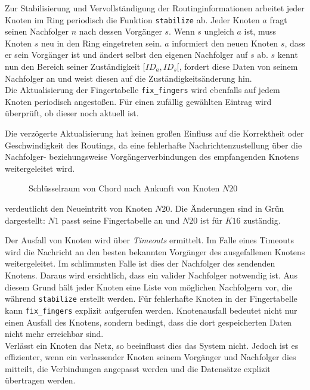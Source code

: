Zur Stabilisierung und Vervollständigung der Routinginformationen arbeitet jeder Knoten im Ring periodisch die Funktion \texttt{stabilize} ab. Jeder Knoten $a$ fragt seinen Nachfolger $n$ nach dessen Vorgänger $s$. Wenn $s$ ungleich $a$ ist, muss Knoten $s$ neu in den Ring eingetreten sein. $a$ informiert den neuen Knoten $s$, dass er sein Vorgänger ist und ändert selbst den eigenen Nachfolger auf $s$ ab. $s$ kennt nun den Bereich seiner Zuständigkeit $[ID_a, ID_s[$, fordert diese Daten von seinem Nachfolger an und weist diesen auf die Zuständigkeitsänderung hin.\\
Die Aktualisierung der Fingertabelle \texttt{fix\_fingers} wird ebenfalls auf jedem Knoten periodisch angestoßen. Für einen zufällig gewählten Eintrag wird überprüft, ob dieser noch aktuell ist.

Die verzögerte Aktualisierung hat keinen großen Einfluss auf die Korrektheit oder Geschwindigkeit des Routings, da eine fehlerhafte Nachrichtenzustellung über die Nachfolger- beziehungsweise Vorgängerverbindungen des empfangenden Knotens weitergeleitet wird.

\begin{figure}[htbp]
\centering
{}
\caption{Schlüsselraum von Chord nach Ankunft von Knoten $N20$}
\label{fig:chord_new_node}
\end{figure}

 verdeutlicht den Neueintritt von Knoten $N20$. Die Änderungen sind in Grün dargestellt: $N1$ passt seine Fingertabelle an und $N20$ ist für $K16$ zuständig.

Der Ausfall von Knoten wird über \emph{Timeouts} ermittelt. Im Falle eines Timeouts wird die Nachricht an den besten bekannten Vorgänger des ausgefallenen Knotens weitergeleitet. Im schlimmsten Falle ist dies der Nachfolger des sendenden Knotens. Daraus wird ersichtlich, dass ein valider Nachfolger notwendig ist. Aus diesem Grund hält jeder Knoten eine Liste von möglichen Nachfolgern vor, die während \texttt{stabilize} erstellt werden. Für fehlerhafte Knoten in der Fingertabelle kann \texttt{fix\_fingers} explizit aufgerufen werden.
Knotenausfall bedeutet nicht nur einen Ausfall des Knotens, sondern bedingt, dass die dort gespeicherten Daten nicht mehr erreichbar sind.\\
Verlässt ein Knoten das Netz, so beeinflusst dies das System nicht. Jedoch ist es effizienter, wenn ein verlassender Knoten seinem Vorgänger und Nachfolger dies mitteilt, die Verbindungen angepasst werden und die Datensätze explizit übertragen werden.
